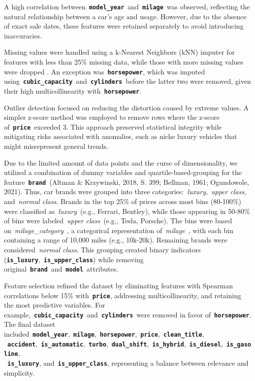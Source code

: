 \documentclass[a4paper,oneside,bibliography=totoc]{scrbook}
\begin{document}
A high correlation between~\textbf{\texttt{model\_year}}~and~\textbf{\texttt{milage}}~was observed, reflecting the natural relationship between a car's age and usage. However, due to the absence of exact sale dates, these features were retained separately to avoid introducing inaccuracies.

Missing values were handled using a k-Nearest Neighbors (kNN) imputer for features with less than 25\% missing data, while those with more missing values were dropped \cite{jadhav2019}. An exception was~\textbf{\texttt{horsepower}}, which was imputed using~\textbf{\texttt{cubic\_capacity}}~and~\textbf{\texttt{cylinders}}~before the latter two were removed, given their high multicollinearity with~\textbf{\texttt{horsepower}}.

Outlier detection focused on reducing the distortion caused by extreme values. A simpler z-score method was employed to remove rows where the z-score of~\textbf{\texttt{price}}~exceeded 3. This approach preserved statistical integrity while mitigating risks associated with anomalies, such as niche luxury vehicles that might misrepresent general trends.

Due to the limited amount of data points and the curse of dimensionality, we utilized a combination of dummy variables and quartile-based-grouping for the feature~\textbf{\texttt{brand}}~(Altman & Krzywinski, 2018, S. 399; Bellman, 1961; Ogundowole, 2021). Thus, car brands were grouped into three categories:~\emph{luxury},~\emph{upper class}, and~\emph{normal class}. Brands in the top 25\% of prices across most bins (80-100\%) were classified as~\emph{luxury}~(e.g., Ferrari, Bentley), while those appearing in 50-80\% of bins were labeled~\emph{upper class}~(e.g., Tesla, Porsche). The bins were based on~\emph{milage\_category}~, a categorical representation of~\emph{milage}~, with each bin containing a range of 10,000 miles (e.g., 10k-20k). Remaining brands were considered~\emph{normal class}. This grouping created binary indicators (\textbf{\texttt{is\_luxury}},~\textbf{\texttt{is\_upper\_class}}) while removing original~\textbf{\texttt{brand}}~and~\textbf{\texttt{model}}~attributes.

Feature selection refined the dataset by eliminating features with Spearman correlations below 15\% with~\textbf{\texttt{price}}, addressing multicollinearity, and retaining the most predictive variables. For example,~\textbf{\texttt{cubic\_capacity}}~and~\textbf{\texttt{cylinders}}~were removed in favor of~\textbf{\texttt{horsepower}}. The final dataset included~\textbf{\texttt{model\_year}},~\textbf{\texttt{milage}},~\textbf{\texttt{horsepower}},~\textbf{\texttt{price}},~\textbf{\texttt{clean\_title}},\\~\textbf{\texttt{accident}},~\textbf{\texttt{is\_automatic}},~\textbf{\texttt{turbo}},~\textbf{\texttt{dual\_shift}},~\textbf{\texttt{is\_hybrid}},~\textbf{\texttt{is\_diesel}},~\textbf{\texttt{is\_gasoline}},\\~\textbf{\texttt{is\_luxury}}, and~\textbf{\texttt{is\_upper\_class}}, representing a balance between relevance and simplicity.
\end{document}
